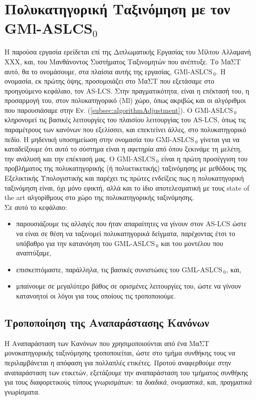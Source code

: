\chapter{Πολυκατηγορική Ταξινόμηση με τον GMl-ASLCS$_{0}$}
Η παρούσα εργασία ερείδεται επί της Διπλωματικής Εργασίας του Μίλτου Αλλαμανή ΧΧΧ, και, του Μανθάνοντος Συστήματος Ταξινομητών που ανέπτυξε. Το ΜαΣΤ αυτό, θα το ονομάσουμε, στα πλαίσια αυτής της εργασίας, GMl-ASLCS$_{\:0}$. Η ονομασία, εκ πρώτης όψης, προσομοιάζει στο ΜαΣΤ που εξετάσαμε στο προηγούμενο κεφάλαιο, τον AS-LCS. Στην πραγματικότητα, είναι η επέκτασή του, η προσαρμογή του, στον πολυκατηγορικό (Ml) χώρο, όπως ακριβώς και οι αλγόριθμοι που παρουσιάσαμε στην Εν. (\ref{subsec:algorithmAdjustment}). Ο GMl-ASLCS$_{\:0}$ κληρονομεί τις  βασικές λειτουργίες του πλαισίου λειτουργίας του AS-LCS, όπως τις παραμέτρους των κανόνων που εξελίσσει, και επεκτείνει άλλες, στο πολυκατηγορικό πεδίο. Η μηδενική υποσημείωση στην ονομασία του GMl-ASLCS$_{\:0}$ γίνεται για να καταδείξουμε ότι αυτό το σύστημα είναι η αφετηρία από όπου ξεκινάμε τη μελέτη, την ανάλυσή και την επέκτασή μας. Ο GMl-ASLCS$_{\:0}$ είναι η πρώτη προσέγγιση του προβλήματος της πολυκατηγορικής (ή πολυετικετικής) ταξινόμησης με μεθόδους της Εξελικτικής Υπολογιστικής και παρέχει τις πρώτες ενδείξεις πως η πολυκατηγορική ταξινόμηση είναι, όχι μόνο εφικτή, αλλά και το ίδιο αποτελεσματική με τους state of the art αλγορίθμους στο χώρο της πολυκατηγορικής ταξινόμησης. 
\\

Σε αυτό το κεφάλαιο: 

\begin{itemize}
\item παρουσιάζουμε τις αλλαγές που ήταν απαραίτητες να γίνουν στον AS-LCS ώστε να είναι σε θέση να ταξινομεί πολυκατηγορικά δείγματα, παρέχοντας έτσι το υπόβαθρο για την κατανόηση του GML-ASLCS$_{\:0}$ και του μοντέλου που αναπτύξαμε,
\item επισκεπτόμαστε, παράλληλα, τις βασικές συνιστώσες του GML-ASLCS$_{\:0}$, και,
\item μπαίνουμε σε μεγαλύτερο βάθος σε ορισμένες λειτουργίες του, ώστε να γίνουν κατανοητοί οι λόγοι για τους οποίους τις τροποποιούμε.
\end{itemize}

\section{Τροποποίηση της Αναπαράστασης Κανόνων}
Η Αναπαράσταση των Κανόνων που χρησιμοποιούνται από ένα ΜαΣΤ μονοκατηγορικής ταξινόμησης τροποποιείται, ώστε στο τμήμα συνθήκης τους να περιλαμβάνεται η απόφαση για πολλαπλές ετικέτες. Προτού αναφερθούμε στην αναπαράσταση των ετικετών, εξετάζουμε την αναπαράσταση του τμήματος συνθήκης για τους διαφορετικούς τύπους γνωρισμάτων: τα \emph{δυαδικά}, \emph{ονομαστικά}, και, \emph{πραγματικά} γνωρίσματα.

